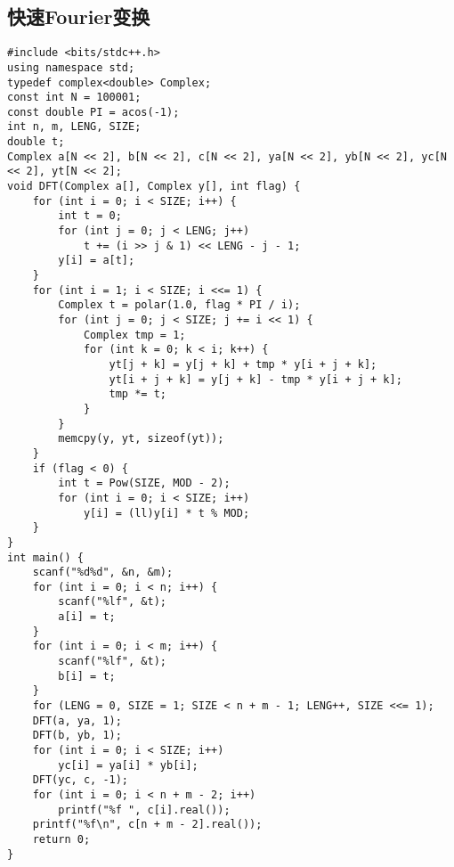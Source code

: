 \documentclass[a4paper]{article}
\begin{document}
\subsection{快速Fourier变换}
\begin{lstlisting}
#include <bits/stdc++.h>
using namespace std;
typedef complex<double> Complex;
const int N = 100001;
const double PI = acos(-1);
int n, m, LENG, SIZE;
double t;
Complex a[N << 2], b[N << 2], c[N << 2], ya[N << 2], yb[N << 2], yc[N << 2], yt[N << 2];
void DFT(Complex a[], Complex y[], int flag) {
    for (int i = 0; i < SIZE; i++) {
        int t = 0;
        for (int j = 0; j < LENG; j++)
            t += (i >> j & 1) << LENG - j - 1;
        y[i] = a[t];
    }
    for (int i = 1; i < SIZE; i <<= 1) {
        Complex t = polar(1.0, flag * PI / i);
        for (int j = 0; j < SIZE; j += i << 1) {
            Complex tmp = 1;
            for (int k = 0; k < i; k++) {
                yt[j + k] = y[j + k] + tmp * y[i + j + k];
                yt[i + j + k] = y[j + k] - tmp * y[i + j + k];
                tmp *= t;
            }
        }
        memcpy(y, yt, sizeof(yt));
    }
    if (flag < 0) {
        int t = Pow(SIZE, MOD - 2);
        for (int i = 0; i < SIZE; i++)
            y[i] = (ll)y[i] * t % MOD;
    }
}
int main() {
    scanf("%d%d", &n, &m);
    for (int i = 0; i < n; i++) {
        scanf("%lf", &t);
        a[i] = t;
    }
    for (int i = 0; i < m; i++) {
        scanf("%lf", &t);
        b[i] = t;
    }
    for (LENG = 0, SIZE = 1; SIZE < n + m - 1; LENG++, SIZE <<= 1);
    DFT(a, ya, 1);
    DFT(b, yb, 1);
    for (int i = 0; i < SIZE; i++)
        yc[i] = ya[i] * yb[i];
    DFT(yc, c, -1);
    for (int i = 0; i < n + m - 2; i++)
        printf("%f ", c[i].real());
    printf("%f\n", c[n + m - 2].real());
    return 0;
}
\end{lstlisting}
\end{document}
